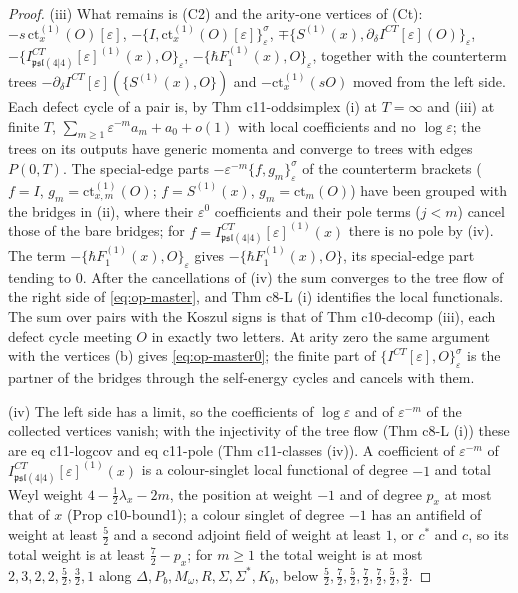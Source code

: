 \documentclass[11pt]{article}
\numberwithin{equation}{section}
\theoremstyle{plain}
\theoremstyle{definition}
\newcommand{\psl}{\mathfrak{psl}(4|4)}
\newcommand{\ct}{\mathrm{ct}}
\begin{document}
\begin{proof}
(iii) What remains is (C2) and the arity-one vertices of (Ct): $-s\,\ct^{(1)}_x(O)[\varepsilon]$, $-\{I,\ct^{(1)}_x(O)[\varepsilon]\}^\sigma_\varepsilon$, $\mp\{S^{(1)}(x),\partial_\delta I^{CT}[\varepsilon](O)\}_\varepsilon$, $-\{I^{CT}_{\psl}[\varepsilon]^{(1)}(x),O\}_\varepsilon$, $-\{\hbar F_1^{(1)}(x),O\}_\varepsilon$, together with the counterterm trees $-\partial_\delta I^{CT}[\varepsilon](\{S^{(1)}(x),O\})$ and $-\ct^{(1)}_x(sO)$ moved from the left side. Each defect cycle of a pair is, by Thm c11-oddsimplex (i) at $T=\infty$ and (iii) at finite $T$, $\sum_{m\ge1}\varepsilon^{-m}a_m+a_0+o(1)$ with local coefficients and no $\log\varepsilon$; the trees on its outputs have generic momenta and converge to trees with edges $P(0,T)$. The special-edge parts $-\varepsilon^{-m}\{f,g_m\}^\sigma_\varepsilon$ of the counterterm brackets ($f=I$, $g_m=\ct^{(1)}_{x,m}(O)$; $f=S^{(1)}(x)$, $g_m=\ct_m(O)$) have been grouped with the bridges in (ii), where their $\varepsilon^0$ coefficients and their pole terms ($j<m$) cancel those of the bare bridges; for $f=I^{CT}_{\psl}[\varepsilon]^{(1)}(x)$ there is no pole by (iv). The term $-\{\hbar F_1^{(1)}(x),O\}_\varepsilon$ gives $-\{\hbar F_1^{(1)}(x),O\}$, its special-edge part tending to $0$. After the cancellations of (iv) the sum converges to the tree flow of the right side of \eqref{eq:op-master}, and Thm c8-L (i) identifies the local functionals. The sum over pairs with the Koszul signs is that of Thm c10-decomp (iii), each defect cycle meeting $O$ in exactly two letters. At arity zero the same argument with the vertices (b) gives \eqref{eq:op-master0}; the finite part of $\{I^{CT}[\varepsilon],O\}^\sigma_\varepsilon$ is the partner of the bridges through the self-energy cycles and cancels with them.

(iv) The left side has a limit, so the coefficients of $\log\varepsilon$ and of $\varepsilon^{-m}$ of the collected vertices vanish; with the injectivity of the tree flow (Thm c8-L (i)) these are eq c11-logcov and eq c11-pole (Thm c11-classes (iv)). A coefficient of $\varepsilon^{-m}$ of $I^{CT}_{\psl}[\varepsilon]^{(1)}(x)$ is a colour-singlet local functional of degree $-1$ and total Weyl weight $4-\tfrac12\lambda_x-2m$, the position at weight $-1$ and of degree $p_x$ at most that of $x$ (Prop c10-bound1); a colour singlet of degree $-1$ has an antifield of weight at least $\tfrac52$ and a second adjoint field of weight at least $1$, or $c^*$ and $c$, so its total weight is at least $\tfrac72-p_x$; for $m\ge1$ the total weight is at most $2,3,2,2,\tfrac52,\tfrac32,1$ along $\Delta,P_b,M_\omega,R,\Sigma,\Sigma^*,K_b$, below $\tfrac52,\tfrac72,\tfrac52,\tfrac72,\tfrac72,\tfrac52,\tfrac32$.


\end{proof}
\end{document}
